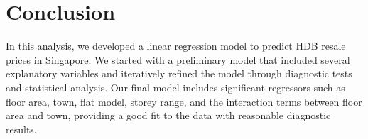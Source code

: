 \section{Conclusion}
In this analysis, we developed a linear regression model to predict HDB resale prices in Singapore. We started with a preliminary model that included several explanatory variables and iteratively refined the model through diagnostic tests and statistical analysis. Our final model includes significant regressors such as floor area, town, flat model, storey range, and the interaction terms between floor area and town, providing a good fit to the data with reasonable diagnostic results.

